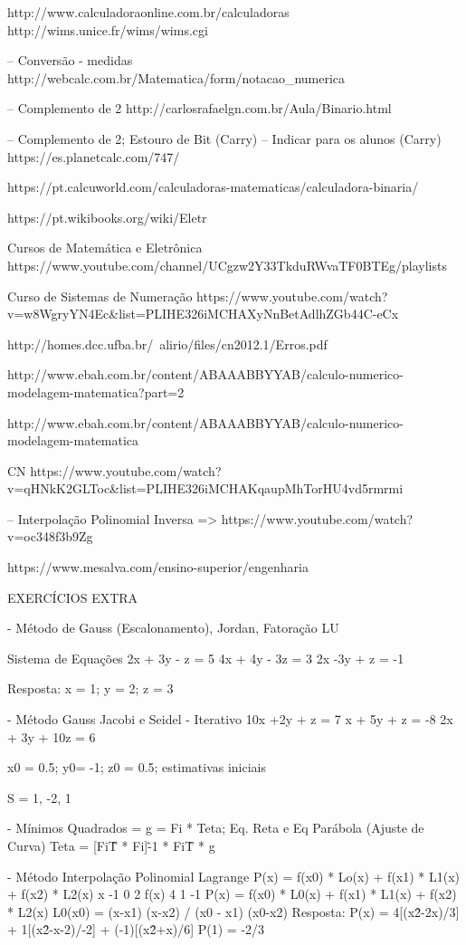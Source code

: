 http://www.calculadoraonline.com.br/calculadoras
http://wims.unice.fr/wims/wims.cgi

-- Conversão - medidas
http://webcalc.com.br/Matematica/form/notacao\_numerica

-- Complemento de 2
http://carlosrafaelgn.com.br/Aula/Binario.html

-- Complemento de 2; Estouro de Bit (Carry)
-- Indicar para os alunos (Carry)
https://es.planetcalc.com/747/

https://pt.calcuworld.com/calculadoras-matematicas/calculadora-binaria/

https://pt.wikibooks.org/wiki/Eletr%

Cursos de Matemática e Eletrônica
https://www.youtube.com/channel/UCgzw2Y33TkduRWvaTF0BTEg/playlists

Curso de Sistemas de Numeração
https://www.youtube.com/watch?v=w8WgryYN4Ec&list=PLIHE326iMCHAXyNnBetAdlhZGb44C-eCx

http://homes.dcc.ufba.br/~alirio/files/cn2012.1/Erros.pdf

http://www.ebah.com.br/content/ABAAABBYYAB/calculo-numerico-modelagem-matematica?part=2

http://www.ebah.com.br/content/ABAAABBYYAB/calculo-numerico-modelagem-matematica

CN
https://www.youtube.com/watch?v=qHNkK2GLToc&list=PLIHE326iMCHAKqaupMhTorHU4vd5rmrmi

-- Interpolação Polinomial Inversa
=> https://www.youtube.com/watch?v=oc348f3b9Zg

https://www.mesalva.com/ensino-superior/engenharia

EXERCÍCIOS EXTRA

- Método de Gauss (Escalonamento), Jordan, Fatoração LU

Sistema de Equações
2x + 3y - z = 5
4x + 4y - 3z = 3
2x -3y + z = -1

Resposta: x = 1; y = 2; z = 3

- Método Gauss Jacobi e Seidel - Iterativo
10x +2y + z = 7
x + 5y + z = -8
2x + 3y + 10z = 6

x0 = 0.5; y0= -1; z0 = 0.5; estimativas iniciais

S = {1, -2, 1}

- Mínimos Quadrados = g = Fi * Teta; Eq. Reta e Eq Parábola (Ajuste de Curva)
Teta = [Fi\^T * Fi]\^-1 * Fi\^T * g

- Método Interpolação Polinomial Lagrange
P(x) = f(x0) * Lo(x) + f(x1) * L1(x) + f(x2) * L2(x)
x       -1  0   2
f(x)    4   1   -1
P(x) = f(x0) * L0(x) + f(x1) * L1(x) + f(x2) * L2(x)
L0(x0) = (x-x1) (x-x2) / (x0 - x1) (x0-x2)
Resposta: P(x) = 4[(x\^2-2x)/3] + 1[(x\^2-x-2)/-2] + (-1)[(x\^2+x)/6]
P(1) = -2/3

